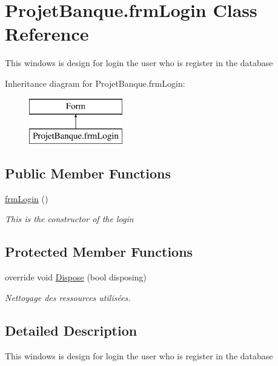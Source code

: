 \hypertarget{class_projet_banque_1_1frm_login}{}\section{Projet\+Banque.\+frm\+Login Class Reference}
\label{class_projet_banque_1_1frm_login}


This windows is design for login the user who is register in the database  


Inheritance diagram for Projet\+Banque.\+frm\+Login\+:\begin{figure}[H]
\begin{center}
\leavevmode
\includegraphics[height=2.000000cm]{class_projet_banque_1_1frm_login}
\end{center}
\end{figure}
\subsection*{Public Member Functions}
\begin{DoxyCompactItemize}
\item 
\mbox{\hyperlink{class_projet_banque_1_1frm_login_a4fcd9d1592741e07be67c4108a8e433e}{frm\+Login}} ()
\begin{DoxyCompactList}\small\item\em This is the constructor of the login \end{DoxyCompactList}\end{DoxyCompactItemize}
\subsection*{Protected Member Functions}
\begin{DoxyCompactItemize}
\item 
override void \mbox{\hyperlink{class_projet_banque_1_1frm_login_a476b5fe8d0ef3fa86ba706a969d744b7}{Dispose}} (bool disposing)
\begin{DoxyCompactList}\small\item\em Nettoyage des ressources utilisées. \end{DoxyCompactList}\end{DoxyCompactItemize}


\subsection{Detailed Description}
This windows is design for login the user who is register in the database 



